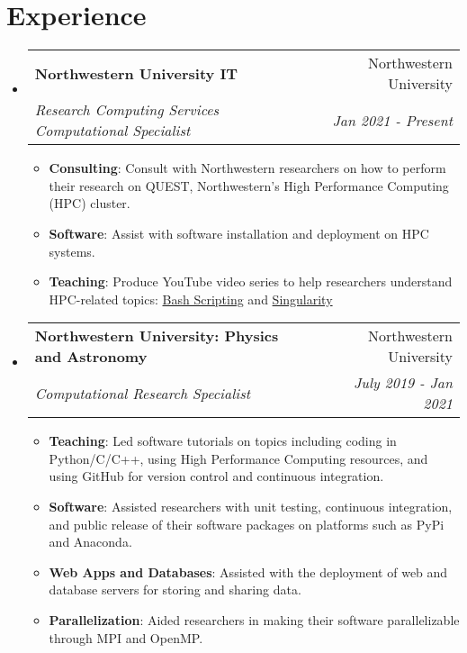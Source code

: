 \documentclass[a4paper,20pt]{article}
\makeatletter
\newcommand{\resumeItem}[2]{
  \item\small{
    \textbf{#1}{: #2 \vspace{-2pt}}
  }
}
\newcommand{\resumeSubheading}[4]{
  \vspace{-1pt}\item
    \begin{tabular*}{0.97\textwidth}{l@{\extracolsep{\fill}}r}
      \textbf{#1} & #2 \\
      \textit{#3} & \textit{#4} \\
    \end{tabular*}\vspace{-5pt}
}
\newcommand{\resumeSubHeadingListStart}{\begin{itemize}[leftmargin=*]}
\newcommand{\resumeSubHeadingListEnd}{\end{itemize}}
\newcommand{\resumeItemListStart}{\begin{itemize}}
\newcommand{\resumeItemListEnd}{\end{itemize}\vspace{-5pt}}
\makeatother
\begin{document}
\section{Experience}
  \resumeSubHeadingListStart
    \resumeSubheading{Northwestern University IT}{Northwestern University}
    {Research Computing Services Computational Specialist}{Jan 2021 - Present}
    \resumeItemListStart
        \resumeItem{Consulting}{Consult with Northwestern researchers on how to perform their research on QUEST, Northwestern's High Performance Computing (HPC) cluster.}
        \resumeItem{Software}{Assist with software installation and deployment on HPC systems.}
        \resumeItem{Teaching}{Produce YouTube video series to help researchers understand HPC-related topics: \href{https://www.youtube.com/playlist?list=PLDzPlBW3jmQBwqxcKkn15KBbL0D-nBjq2}{Bash Scripting} and \href{https://www.youtube.com/playlist?list=PLDzPlBW3jmQBMEgAvd1i700Bd_Ia7XNfH}{Singularity}}
	\resumeItemListEnd
	\resumeSubheading{Northwestern University: Physics and Astronomy}{Northwestern University}
	{Computational Research Specialist}{July 2019 -  Jan 2021}
		\resumeItemListStart
        \resumeItem{Teaching}
          {Led software tutorials on topics including coding in Python/C/C++, using High Performance Computing resources, and using GitHub for version control and continuous integration.}
        \resumeItem{Software}
        {Assisted researchers with unit testing, continuous integration, and public release of their software packages on platforms such as PyPi and Anaconda.}
        \resumeItem{Web Apps and Databases}
        {Assisted with the deployment of web and database servers for storing and sharing data.}
        \resumeItem{Parallelization}
        {Aided researchers in making their software parallelizable through MPI and OpenMP.}
		\resumeItemListEnd

\resumeSubHeadingListEnd

\vspace{-5pt}
\end{document}
